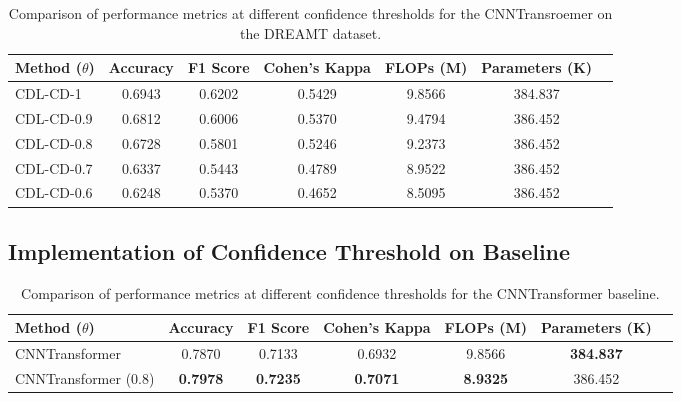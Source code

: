 \begin{table}[ht]
    \centering
    \begin{tabular}{lcccccc}
        \toprule
        Method (\(\theta\)) & Accuracy & F1 Score & Cohen's Kappa & FLOPs (M) & Parameters (K) \\
        \midrule
        CDL-CD-1 & 0.6943 & 0.6202 & 0.5429 & 9.8566 & 384.837\\
        CDL-CD-0.9 & 0.6812 & 0.6006 & 0.5370 & 9.4794 & 386.452 \\
        CDL-CD-0.8 & 0.6728 & 0.5801 & 0.5246 & 9.2373 & 386.452 \\
        CDL-CD-0.7 & 0.6337 & 0.5443 & 0.4789 & 8.9522 & 386.452 \\
        CDL-CD-0.6 & 0.6248 & 0.5370 & 0.4652 & 8.5095 & 386.452 \\
        \bottomrule
    \end{tabular}
    \caption{Comparison of performance metrics at different confidence thresholds for the CNNTransroemer on the DREAMT dataset.}
    \label{tab:performance_of_different_confidence}
\end{table}




\subsection{Implementation of Confidence Threshold on Baseline}


\begin{table}[ht]
    \centering
    \begin{tabular}{lcccccc}
        \toprule
        Method (\(\theta\)) & Accuracy & F1 Score & Cohen's Kappa & FLOPs (M) & Parameters (K) \\
        \midrule
        CNNTransformer & 0.7870 & 0.7133 & 0.6932 & 9.8566 & \textbf{384.837}\\
        CNNTransformer (0.8) & \textbf{0.7978} & \textbf{0.7235} & \textbf{0.7071} & \textbf{8.9325} & 386.452 \\
        \bottomrule
    \end{tabular}
    \caption{Comparison of performance metrics at different confidence thresholds for the CNNTransformer baseline.}
    \label{tab:performance_of_baseline_with_confidence}
\end{table}



